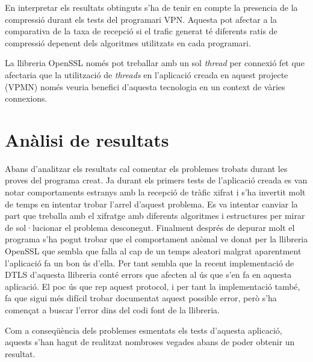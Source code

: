 En interpretar els resultats obtinguts s'ha de tenir en compte la presencia de la compressió durant els tests del programari VPN. Aquesta pot afectar a la comparativa de la taxa de recepció si el trafic generat té diferents ratis de compressió depenent dels algoritmes utilitzats en cada programari.

La llibreria OpenSSL només pot treballar amb un sol \emph{thread} per connexió fet que afectaria que la utilització de \emph{threads} en l'aplicació creada en aquest projecte (VPMN) només veuria benefici d'aquesta tecnologia en un context de vàries connexions.


\section{Anàlisi de resultats}
Abans d'analitzar els resultats cal comentar els problemes trobats durant les proves del programa creat. 
Ja durant els primers tests de l'aplicació creada es van notar comportaments estranys amb la recepció de tràfic xifrat i s'ha invertit molt de temps en intentar trobar l'arrel d'aquest problema. Es va intentar canviar la part que treballa amb el xifratge amb diferents algoritmes i estructures per mirar de sol·lucionar el problema desconegut. Finalment després de depurar molt el programa s'ha pogut trobar que el comportament anòmal ve donat per la llibreria OpenSSL que sembla que falla al cap de un temps aleatori malgrat aparentment l'aplicació fa un bon ús d'ella. Per tant sembla que la recent implementació de DTLS d'aquesta llibreria conté errors que afecten al ús que s'en fa en aquesta aplicació.
El poc ús que rep aquest protocol, i per tant la implementació també, fa que sigui més difícil trobar documentat aquest possible error, però s'ha començat a buscar l'error dins del codi font de la llibreria.

Com a conseqüència dels problemes esmentats els tests d'aquesta aplicació, aquests s'han hagut de realitzat nombroses vegades abans de poder obtenir un resultat.

